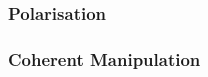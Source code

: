 \subsubsection{Polarisation}
\cite{PhysRevLett.112.087601}

\subsubsection{Coherent Manipulation}
\cite{Widmann2014}

\cite{PhysRevB.105.165108}

\cite{Yan2020}


\cite{Koehl2011}

\cite{Mu2020}


\cite{PhysRevLett.124.223601}

